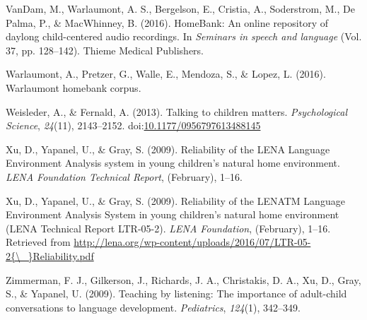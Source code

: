 \documentclass[english,table,man,floatsintext]{apa6}
\begin{document}
\leavevmode\hypertarget{ref-vandam2016homebank}{}%
VanDam, M., Warlaumont, A. S., Bergelson, E., Cristia, A., Soderstrom, M., De Palma, P., \& MacWhinney, B. (2016). HomeBank: An online repository of daylong child-centered audio recordings. In \emph{Seminars in speech and language} (Vol. 37, pp. 128--142). Thieme Medical Publishers.

\leavevmode\hypertarget{ref-warlaumont2016warlaumont}{}%
Warlaumont, A., Pretzer, G., Walle, E., Mendoza, S., \& Lopez, L. (2016). Warlaumont homebank corpus.

\leavevmode\hypertarget{ref-Weisleder2013a}{}%
Weisleder, A., \& Fernald, A. (2013). Talking to children matters. \emph{Psychological Science}, \emph{24}(11), 2143--2152. doi:\href{https://doi.org/10.1177/0956797613488145}{10.1177/0956797613488145}

\leavevmode\hypertarget{ref-Xu2009}{}%
Xu, D., Yapanel, U., \& Gray, S. (2009). Reliability of the LENA Language Environment Analysis system in young children's natural home environment. \emph{LENA Foundation Technical Report}, (February), 1--16.

\leavevmode\hypertarget{ref-Xu2009a}{}%
Xu, D., Yapanel, U., \& Gray, S. (2009). Reliability of the LENATM Language Environment Analysis System in young children's natural home environment (LENA Technical Report LTR-05-2). \emph{LENA Foundation}, (February), 1--16. Retrieved from \href{http://lena.org/wp-content/uploads/2016/07/LTR-05-2\%7B/_\%7DReliability.pdf}{http://lena.org/wp-content/uploads/2016/07/LTR-05-2\{\textbackslash{}\_\}Reliability.pdf}

\leavevmode\hypertarget{ref-zimmerman2009}{}%
Zimmerman, F. J., Gilkerson, J., Richards, J. A., Christakis, D. A., Xu, D., Gray, S., \& Yapanel, U. (2009). Teaching by listening: The importance of adult-child conversations to language development. \emph{Pediatrics}, \emph{124}(1), 342--349.
\end{document}

